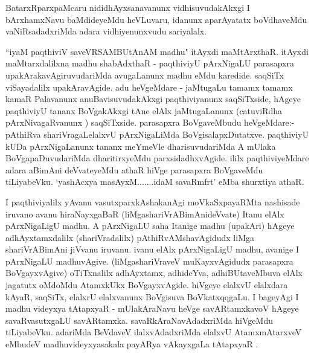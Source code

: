 \begin{center}


\end{center}

\begin{artha}
BatarxRparxpaMcaru nididhAyxsanavanunx vidhisuvudakAkxgi I bArxhamxNavu baMdideyeMdu 
heVLuvaru, idanunx aparAyatatx boVdhaveMdu vaNiRsadadxriMda adara vidhiyenunxvudu
sariyalalx.
\end{artha}

\begin{artha}
``iyaM paqthiviV saveVRSAMBUtAnAM madhu" itAyxdi maMtArxthaR. itAyxdi maMtarxdalilxna madhu shabAdxthaR - paqthiviyU 
pArxNigaLU parasapxra upakArakavAgiruvudariMda avugaLanunx madhu eMdu karedide. saqSiTx viSayadalilx upakAravAgide. adu heVgeMdare - jaMtugaLu tamamx tamamx kamaR Palavanunx 
anuBavisuvudakAkxgi paqthiviyanunx saqSiTxside, hAgeye paqthiviyU tananx BoVgakAkxgi tAne 
elAlx jaMtugaLanunx (catuviRdha pArxNivagaRvanunx ) saqSiTxside. parasapxra BoVgaveMbudu 
heVgeMdare:- pAthiRva shariVragaLelalxvU pArxNigaLiMda BoVgisalapxDutatxve. paqthiviyU 
kUDa pArxNigaLanunx tananx meYmeVle dharisuvudariMda A mUlaka BoVgapaDuvudariMda 
dharitirxyeMdu parxsidadhxvAgide. ililx paqthiviyeMdare adara aBimAni deVvateyeMdu athaR hiVge parasapxra BoVgaveMdu tiLiyabeVku. `yashAcxya masAyxM.......idaM savaRmfrt' eMba shurxtiya athaR. 
\end{artha}

\begin{center}


\end{center}

\begin{artha}
I paqthiviyalilx yAvanu vasutxparxkAshakanAgi moVkaSxpayaRMta nashisade iruvano avanu hiraNayxgaBaR (liMgashariVrABimAnideVvate) Itanu elAlx pArxNigaLigU madhu. A pArxNigaLU saha Itanige madhu (upakAri) hAgeye adhAyxtamxdalilx (shariVradalilx) pAthiRvAMshavAgidudx liMga shariVrABimAni jiVvanu iruvanu. ivanu elAlx pArxNigaLigU madhu, avanige I pArxNigaLU madhuvAgive. (liMgashariVraveV muKayxvAgidudx parasapxra BoVgayxvAgive) oTiTxnalilx adhAyxtamx, adhideYva, adhiBUtaveMbuva elAlx jagatutx oMdoMdu AtamxkUkx BoVgayxvAgide. hiVgeye elalxvU elalxdara kAyaR, saqSiTx, elalxrU elalxvanunx BoVgisuva BoVkatxqqgaLu. I bageyAgi I madhu videyxya tAtapxyaR - mUlakAraNavu heVge savARtamxkavoV hAgeye savaRvasutxgaLU savARtamxka. savaRkAraNavAdadxriMda hiVgeMdu tiLiyabeVku. adariMda BeVdaveV ilalxvAdadxriMda elalxvU AtamxmAtarxveV eMbudeV madhuvideyxyasakala payARya vAkayxgaLa tAtapxyaR .
\end{artha}

